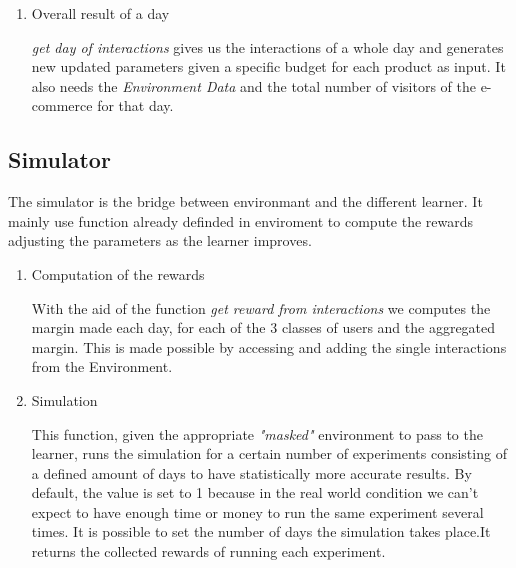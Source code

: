 \begin{enumerate}
    \item Overall result of a day
    
    \textit{get day of interactions} gives us the interactions of a whole day and generates new updated parameters given a specific budget for each product as input. It also needs the \textit{Environment Data} and the total number of visitors of the e-commerce for that day.
    \end{enumerate}
     \subsection{Simulator}
     The simulator is the bridge between environmant and the different learner. It mainly use function already definded in enviroment to compute the rewards adjusting the parameters as the learner improves.
     \begin{enumerate}
     \item Computation of the rewards
     
     With the aid of the function \textit{get reward from interactions} we computes the margin made each day, for each of the 3 classes of users and the aggregated margin. This is made possible by accessing and adding the single interactions from the Environment.
     
     \item Simulation
     
     This function, given the appropriate \textit{"masked"} environment to pass to the learner, runs the simulation for a certain number of experiments consisting of a defined amount of days to have statistically more accurate results. By default, the value is set to 1 because in the real world condition we can't expect to have enough time or money to run the same experiment several times. It is possible to set the number of days the simulation takes place.It returns the collected rewards of running each experiment.
\end{enumerate}
